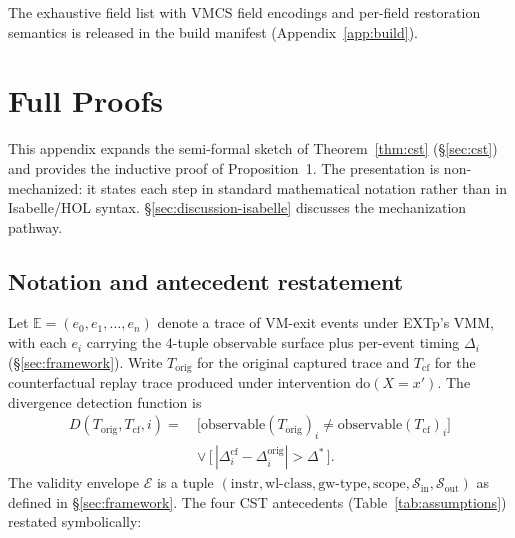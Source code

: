 \documentclass[conference]{IEEEtran}
\newcommand{\Korig}{T_\text{orig}}
\newcommand{\Tcf}{T_\text{cf}}
\newcommand{\Dstar}{\Delta^{*}}
\newcommand{\dox}[1]{\text{do}(X{=}#1)}
\begin{document}
The exhaustive field list with VMCS field encodings and per-field
restoration semantics is released in the build manifest
(Appendix~\ref{app:build}).

\section{Full Proofs}\label{app:proofs}

This appendix expands the semi-formal sketch of
Theorem~\ref{thm:cst} (\S\ref{sec:cst}) and provides the inductive
proof of Proposition~1. The presentation is non-mechanized: it
states each step in standard mathematical notation rather than in
Isabelle/HOL syntax. \S\ref{sec:discussion-isabelle} discusses the
mechanization pathway.

\subsection{Notation and antecedent restatement}

Let $\mathbb{E} = (e_0, e_1, \ldots, e_n)$ denote a trace of
VM-exit events under EXTp's VMM, with each $e_i$ carrying the
4-tuple observable surface plus per-event timing $\Delta_i$
(\S\ref{sec:framework}). Write $\Korig$ for the original captured
trace and $\Tcf$ for the counterfactual replay trace produced
under intervention $\dox{x'}$. The divergence detection function
is
\begin{equation*}
\begin{aligned}
D(\Korig, \Tcf, i) =\ & \big[\text{observable}(\Korig)_i \neq \text{observable}(\Tcf)_i\big] \\
                      & \vee\,\big[\,|\Delta_i^{\text{cf}} - \Delta_i^{\text{orig}}| > \Dstar\,\big].
\end{aligned}
\end{equation*}
The validity envelope $\mathcal{E}$ is a tuple
$(\text{instr}, \text{wl-class}, \text{gw-type}, \text{scope},
\mathcal{S}_\text{in}, \mathcal{S}_\text{out})$ as defined in
\S\ref{sec:framework}. The four CST antecedents
(Table~\ref{tab:assumptions}) restated symbolically:
\end{document}

